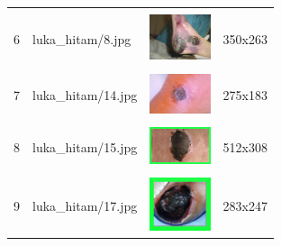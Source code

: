 \begin{table}[H]
\begin{tabular}{|m{0.2in}|m{1.2in}|m{0.7in}|m{0.7in}|}
		& &  &  \\
		6& 
		luka\_hitam/8.jpg &
		\includegraphics[width=0.7in]{gambar/dataset_citra/luka_hitam/8.jpg}&
		350x263\\
		\hline
		
		& &  &  \\
		7& 
		luka\_hitam/14.jpg &
		\includegraphics[width=0.7in]{gambar/dataset_citra/luka_hitam/14.jpg}&
		275x183\\
		\hline

		& &  &  \\
		8 & 
		luka\_hitam/15.jpg &
		\includegraphics[width=0.7in]{gambar/dataset_citra/luka_hitam/15.jpg}&
		512x308\\
		\hline
		
		& &  &  \\
		9 & 
		luka\_hitam/17.jpg &
		\includegraphics[width=0.7in]{gambar/dataset_citra/luka_hitam/17.jpg}&
		283x247\\
		\hline
	\end{tabular}
\end{table}


